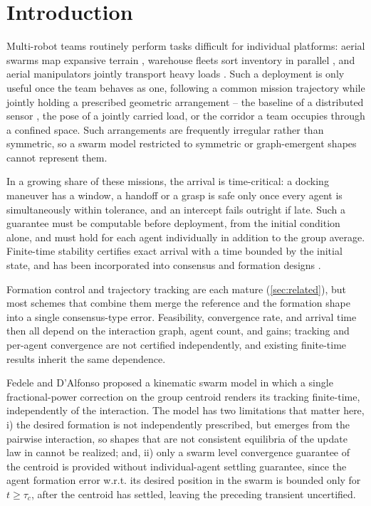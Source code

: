 \documentclass[letterpaper, 10 pt, conference]{ieeeconf}
\begin{document}
\section{Introduction}
\label{sec:intro}
Multi-robot teams routinely perform tasks difficult for individual platforms: aerial swarms map expansive terrain \cite{chung2018survey}, warehouse fleets sort inventory in parallel \cite{wurman2008coordinating}, and aerial manipulators jointly transport heavy loads \cite{michael2011cooperative}. Such a deployment is only useful once
the team behaves as one, following a common mission trajectory while
jointly holding a prescribed geometric arrangement -- the baseline of
a distributed sensor \cite{krieger2007tandem}, the pose of a jointly
carried load, or the corridor a team occupies through a confined
space. Such arrangements are frequently irregular rather than
symmetric, so a swarm model restricted to symmetric or graph-emergent
shapes cannot represent them.

In a growing share of these missions, the arrival is time-critical: a
docking maneuver has a window, a handoff or a grasp is safe only once
every agent is simultaneously within tolerance, and an intercept fails
outright if late. Such a guarantee must be computable before
deployment, from the initial condition alone, and must hold for each
agent individually in addition to the group average. Finite-time stability
\cite{haimo1986finite,bhat2000finite} certifies exact arrival with a time
bounded by the initial state, and has been incorporated into consensus and
formation designs \cite{wang2010finite,xiao2009finite}.

Formation control and trajectory tracking are each mature (\cref{sec:related}), but most schemes that combine them merge the reference and the formation shape into a single consensus-type error. Feasibility, convergence rate, and arrival time then all depend on the interaction graph, agent count, and gains; tracking and per-agent convergence are not certified independently, and existing finite-time results inherit the same dependence.

Fedele and D'Alfonso \cite{fedele2019kinematic} proposed a kinematic
swarm model in which a single fractional-power correction on the group
centroid renders its tracking finite-time, independently of the
interaction. The model has two limitations that matter here, i) the
desired formation is not independently prescribed, but emerges from the
pairwise interaction, so shapes that are not consistent equilibria of
the update law in \cite{fedele2019kinematic} cannot be realized; and, ii) only a swarm level convergence guarantee of the centroid is provided without individual-agent settling guarantee, since the agent formation error w.r.t. its desired position in the swarm is bounded only for
$t\ge\tau_c$, after the centroid has settled, leaving the preceding
transient uncertified.
\end{document}
